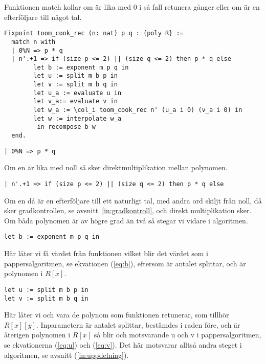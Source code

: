 Funktionen match kollar om  är lika med 0 i så fall retunera  gånger
 eller om  är en efterföljare till något tal.


\begin{lstlisting}
Fixpoint toom_cook_rec (n: nat) p q : {poly R} :=
  match n with
  | 0%N => p * q
  | n'.+1 => if (size p <= 2) || (size q <= 2) then p * q else
        let b := exponent m p q in
        let u := split m b p in
        let v := split m b q in
        let u_a := evaluate u in
        let v_a:= evaluate v in
        let w_a := \col_i toom_cook_rec n' (u_a i 0) (v_a i 0) in
        let w := interpolate w_a
         in recompose b w
  end.
\end{lstlisting}

\begin{lstlisting}
| 0%N => p * q
\end{lstlisting}

Om en  är lika med noll så sker direktmultiplikation mellan polynomen.

\begin{lstlisting}
| n'.+1 => if (size p <= 2) || (size q <= 2) then p * q else
\end{lstlisting}

Om en  då är en efterföljare till ett naturligt tal, med andra ord skiljt
från noll, då sker gradkontrollen, se avsnitt~\ref{in:gradkontroll}, och direkt
multiplikation sker. Om båda polynomen är av högre grad än två så stegar vi
vidare i algoritmen.

\begin{lstlisting}
let b := exponent m p q in
\end{lstlisting}

Här låter vi  få värdet från funktionen  vilket blir det
värdet som i pappersalgoritmen, se ekvationen (\ref{eq:b}), eftersom  är
antalet splittar,  och  är polynomen i $R[x]$.

\begin{lstlisting}
let u := split m b p in
let v := split m b q in
\end{lstlisting}

Här låter vi  och  vara de polynom som funktionen 
retunerar, som tillhör $R[x][y]$. Inparametern  är antalet splittar, 
bestämdes i raden före,  och  är återigen polynomen i $R[x]$ så blir 
 och  motsvarande u och v i pappersalgoritmen, se ekvationerna
(\ref{eq:u}) och (\ref{eq:v}). Det här motsvarar alltså andra steget i
algoritmen, se avsnitt (\ref{in:uppdelning}).

